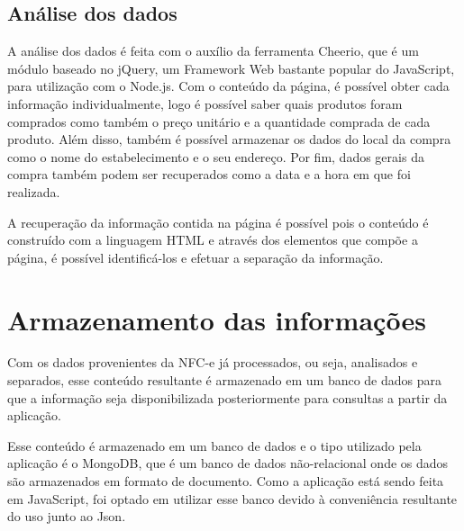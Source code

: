 \subsection{Análise dos dados}

A análise dos dados é feita com o auxílio da ferramenta Cheerio\cite{cheerio}, que é um módulo baseado no jQuery, um Framework Web bastante popular do JavaScript\cite{stackOverflowRanking}, para utilização com o Node.js. Com o conteúdo da página, é possível obter cada informação individualmente, logo é possível saber quais produtos foram comprados como também o preço unitário e a quantidade comprada de cada produto. Além disso, também é possível armazenar os dados do local da compra como o nome do estabelecimento e o seu endereço. Por fim, dados gerais da compra também podem ser recuperados como a data e a hora em que foi realizada.

A recuperação da informação contida na página é possível pois o conteúdo é construído com a linguagem HTML e através dos elementos que compõe a página, é possível identificá-los e efetuar a separação da informação.

\section{Armazenamento das informações}
\label{armazenamentoInfo}

Com os dados provenientes da NFC-e já processados, ou seja, analisados e separados, esse conteúdo resultante é armazenado em um banco de dados para que a informação seja disponibilizada posteriormente para consultas a partir da aplicação.

Esse conteúdo é armazenado em um banco de dados e o tipo utilizado pela aplicação é o MongoDB, que é um banco de dados não-relacional onde os dados são armazenados em formato de documento. Como a aplicação está sendo feita em JavaScript, foi optado em utilizar esse banco devido à conveniência resultante do uso junto ao Json.\cite{mongoDBDefinition}

